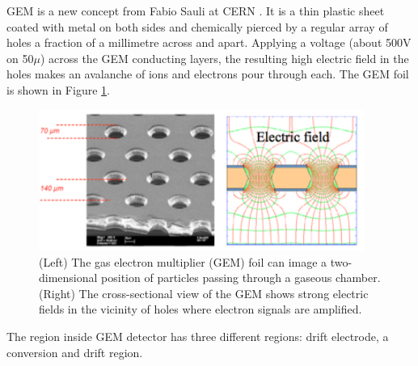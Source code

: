 GEM is a new concept from Fabio Sauli at CERN \cite{Sauli1997}.
It is a thin plastic sheet coated with metal on both sides and chemically pierced by a regular array of holes a fraction of a millimetre across and apart. 
Applying a voltage (about 500V on 50$\mu$) across the GEM conducting layers, the resulting high electric field in the holes makes an avalanche of ions and electrons pour through each. 
The GEM foil is shown in Figure \ref{fig:gem}.
\begin{figure}[!htbp]
	\centering
	\includegraphics[width=0.95\textwidth]{figures/GEM/KEKDTP3.jpg}
	\caption{(Left) The gas electron multiplier (GEM) foil can image a two-dimensional position of particles passing through a gaseous chamber. (Right) The cross-sectional view of the GEM shows strong electric fields in the vicinity of holes where electron signals are amplified.}
	\label{fig:gem}
\end{figure}
The region inside GEM detector has three different regions: drift electrode, a conversion and drift region.

